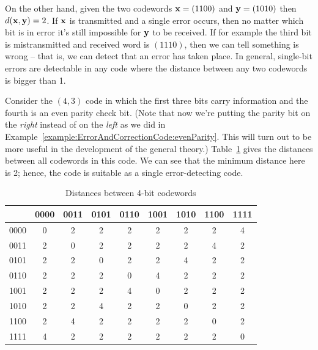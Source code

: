 On the other hand, given the two codewords ${\bold x} = (1100)$
and ${\bold y} = (1010)$ then $d({\bold x}, {\bold y})
= 2$. If ${\bold x}$ is transmitted and a single error occurs, then no matter which bit is in error it's still impossible for 
${\bold y}$ to be received. If for example the third bit is mistransmitted and received word is $(1110)$, then we can tell something is wrong -- that is, we can detect that an error has taken place. In general, single-bit errors are detectable in any code where the distance between any two codewords is bigger than 1.

\begin{example}{} Consider the $(4,3)$ code in which the first three bits carry
information and the fourth is an even parity check bit. (Note that now we're putting the parity bit on the \emph{right} instead of on the \emph{left} as we did in Example~\ref{example:ErrorAndCorrectionCode:evenParity}. This will turn out to be more useful in the development of the general theory.)
Table~\ref{algcodes:table1} gives the distances
between all codewords in this code.  We can see
that the minimum distance here is 2; hence, the code is suitable as
a single error-detecting code. 
  
\begin{table}[hbt]
\caption{Distances between 4-bit codewords\label{algcodes:table1}}{\small
\begin{center}
\begin{tabular}{|c|cccccccc|}
\hline
    & 0000 & 0011 & 0101 & 0110 & 1001 & 1010 & 1100 & 1111
\\ \hline
0000 & 0 & 2 & 2 & 2 & 2 & 2 & 2 & 4 \\
0011 & 2 & 0 & 2 & 2 & 2 & 2 & 4 & 2 \\
0101 & 2 & 2 & 0 & 2 & 2 & 4 & 2 & 2 \\
0110 & 2 & 2 & 2 & 0 & 4 & 2 & 2 & 2 \\
1001 & 2 & 2 & 2 & 4 & 0 & 2 & 2 & 2 \\
1010 & 2 & 2 & 4 & 2 & 2 & 0 & 2 & 2 \\
1100 & 2 & 4 & 2 & 2 & 2 & 2 & 0 & 2 \\
1111 & 4 & 2 & 2 & 2 & 2 & 2 & 2 & 0 \\
\hline
\end{tabular}
\end{center}
}
\end{table}
\end{example}
 
